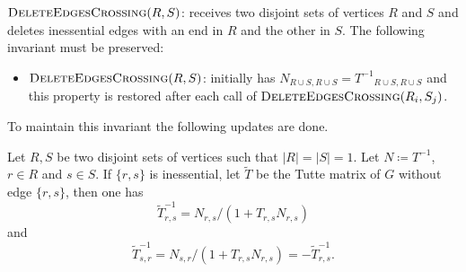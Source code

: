 $\textsc{DeleteEdgesCrossing}(R, S)$: receives two disjoint sets of vertices \(R\) and \(S\) and 
deletes inessential edges with an end in \(R\) and the other in \(S\).
The following invariant must be preserved:
\begin{itemize}
    \item \(\textsc{DeleteEdgesCrossing}(R, S)\): initially has \(N_{R \cup S, R \cup S} = {T^{-1}}_{R \cup S, R \cup S}\) and this property is restored after each call 
    of \(\textsc{DeleteEdgesCrossing}(R_i, S_j)\).
\end{itemize}
To maintain this invariant the following updates are done. 

\begin{theorem}[Update 1]
\label{update:1}
    Let \(R, S\) be two disjoint sets of vertices such that \(|R| = |S| = 1\).
    Let \(N \coloneqq T^{-1}\), \(r \in R\) and \(s \in S\).
    If \(\{r, s\}\) is inessential, let \(\tilde{T}\) be the Tutte matrix of \(G\) without edge \(\{r, s\}\), then one has
    \[
        \tilde{T}^{-1}_{r, s} = N_{r, s} / (1 + T_{r, s} N_{r, s})
    \]
    and
    \[
        \tilde{T}^{-1}_{s, r} = N_{s, r} / (1 + T_{r, s} N_{r, s}) = -\tilde{T}^{-1}_{r, s}.
    \]
\end{theorem}

